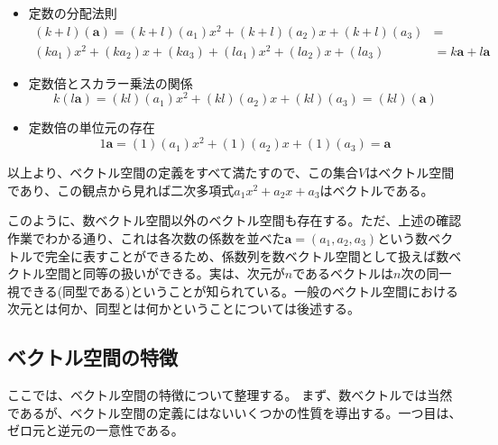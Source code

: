 \begin{itemize}
	\item 定数の分配法則
	      \begin{equation}
		      \begin{split}
			      (k+l)(\boldsymbol{a})=
			      (k+l)(a_1) x^2+(k+l)(a_2) x+(k+l)(a_3) &= \\
			      (ka_1) x^2+(ka_2) x+(ka_3) + (la_1) x^2+(la_2) x+(la_3) &=
			      k\boldsymbol{a}+l\boldsymbol{a}
		      \end{split}
	      \end{equation}

	\item 定数倍とスカラー乗法の関係
	      \begin{equation}
		      k(l\boldsymbol{a})=
		      (kl)(a_1) x^2+(kl)(a_2) x+(kl)(a_3)=
		      (kl)(\boldsymbol{a})
	      \end{equation}

	\item 定数倍の単位元の存在
	      \begin{equation}
		      1\boldsymbol{a}=
		      (1)(a_1) x^2+(1)(a_2) x+(1)(a_3)=
		      \boldsymbol{a}
	      \end{equation}

\end{itemize}
以上より、ベクトル空間の定義をすべて満たすので、この集合\(V\)はベクトル空間であり、この観点から見れば二次多項式\(a_1x^2+a_2x+a_3\)はベクトルである。

このように、数ベクトル空間以外のベクトル空間も存在する。ただ、上述の確認作業でわかる通り、これは各次数の係数を並べた\(\boldsymbol{a}=(a_1,a_2,a_3)\)という数ベクトルで完全に表すことができるため、係数列を数ベクトル空間として扱えば数ベクトル空間と同等の扱いができる。実は、次元が\(n\)であるベクトルは\(n\)次の同一視できる(同型である)ということが知られている。一般のベクトル空間における次元とは何か、同型とは何かということについては後述する。

\subsection{ベクトル空間の特徴}
ここでは、ベクトル空間の特徴について整理する。
まず、数ベクトルでは当然であるが、ベクトル空間の定義にはないいくつかの性質を導出する。一つ目は、ゼロ元と逆元の一意性である。

